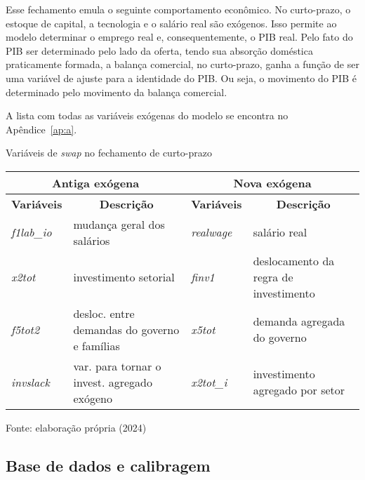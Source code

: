 Esse fechamento emula o seguinte comportamento econômico. No curto-prazo, o estoque de capital, a tecnologia e o salário real são exógenos. Isso permite ao modelo determinar o emprego real e, consequentemente, o PIB real. Pelo fato do PIB ser determinado pelo lado da oferta, tendo sua absorção doméstica praticamente formada, a balança comercial, no curto-prazo, ganha a função de ser uma variável de ajuste para a identidade do PIB. Ou seja, o movimento do PIB é determinado pelo movimento da balança comercial.

A lista com todas as variáveis exógenas do modelo se encontra no Apêndice~\ref{ap:a}.


\begin{quadro}[h]
	\centering
	\begin{threeparttable}
		\caption{Variáveis de \textit{swap} no fechamento de curto-prazo} \label{quad:fechamento}
		\footnotesize
		\begin{tabular}{||l m{6.5cm} |l m{5.5cm} ||}
			\hline \hline
			\multicolumn{2}{||c|}{\textbf{Antiga exógena}}                     & \multicolumn{2}{c||}{\textbf{Nova exógena}} \\ \hline
			\textbf{Variáveis} & \multicolumn{1}{c|}{\textbf{Descrição}}      & \textbf{Variáveis} & \multicolumn{1}{c||}{\textbf{Descrição}} \\ \hline
			\textit{f1lab\_io}  & mudança geral dos salários                  & \textit{realwage}  & salário real \\
			\textit{x2tot}     & investimento setorial                        & \textit{finv1}     & deslocamento da regra de investimento \\
			\textit{f5tot2}    & desloc. entre demandas do governo e famílias & \textit{x5tot}     & demanda agregada do governo \\
			\textit{invslack}  & var. para tornar o invest. agregado exógeno  & \textit{x2tot\_i}  & investimento agregado por setor \\ \hline \hline
		\end{tabular}
		\begin{tablenotes}
			\scriptsize
			\item Fonte: elaboração própria (2024)
		\end{tablenotes}
	\end{threeparttable}
\end{quadro}


\subsection{Base de dados e calibragem} \label{sec:dados_egc}

